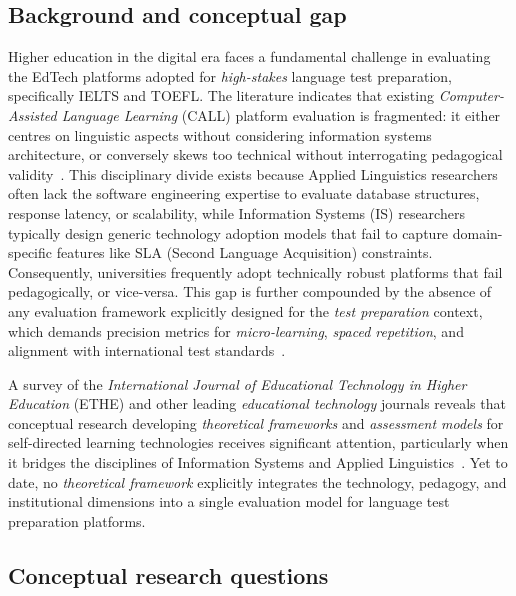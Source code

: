 \documentclass[11pt,a4paper]{article}
\begin{document}
\subsection{Background and conceptual gap}

Higher education in the digital era faces a fundamental challenge in evaluating the EdTech platforms adopted for \textit{high-stakes} language test preparation, specifically IELTS and TOEFL. The literature indicates that existing \textit{Computer-Assisted Language Learning} (CALL) platform evaluation is fragmented: it either centres on linguistic aspects without considering information systems architecture, or conversely skews too technical without interrogating pedagogical validity~\cite{b1}\cite{b2}. This disciplinary divide exists because Applied Linguistics researchers often lack the software engineering expertise to evaluate database structures, response latency, or scalability, while Information Systems (IS) researchers typically design generic technology adoption models that fail to capture domain-specific features like SLA (Second Language Acquisition) constraints. Consequently, universities frequently adopt technically robust platforms that fail pedagogically, or vice-versa. This gap is further compounded by the absence of any evaluation framework explicitly designed for the \textit{test preparation} context, which demands precision metrics for \textit{micro-learning}, \textit{spaced repetition}, and alignment with international test standards~\cite{b3}.

A survey of the \textit{International Journal of Educational Technology in Higher Education} (ETHE) and other leading \textit{educational technology} journals reveals that conceptual research developing \textit{theoretical frameworks} and \textit{assessment models} for self-directed learning technologies receives significant attention, particularly when it bridges the disciplines of Information Systems and Applied Linguistics~\cite{b4}\cite{b5}. Yet to date, no \textit{theoretical framework} explicitly integrates the technology, pedagogy, and institutional dimensions into a single evaluation model for language test preparation platforms.

\subsection{Conceptual research questions}
\end{document}
